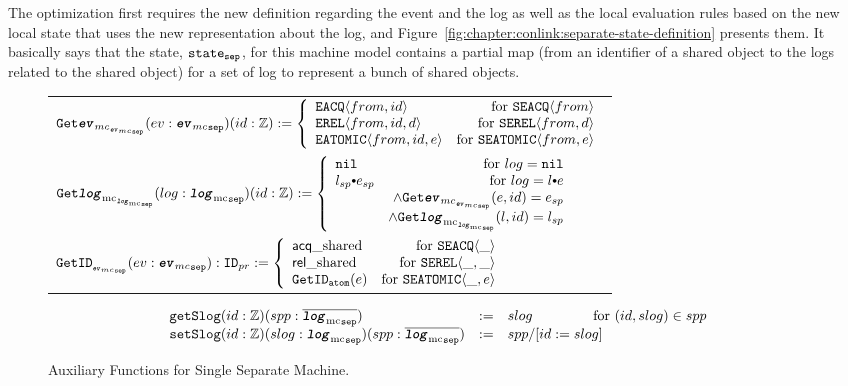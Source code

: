 The optimization first requires the new definition regarding the event and the log as well as 
the local evaluation rules based on the new local state that uses the new representation about the log,
and Figure~\ref{fig:chapter:conlink:separate-state-definition} presents them. 
It basically says that the state, ${{\mathrm{\texttt{state}}}_{{\mathrm{\texttt{sep}}}}}$, for this machine model contains a partial map (from an identifier of a shared object to the logs related to the shared object) for a set of log to represent a bunch of shared objects.


\begin{figure}
\noindent{}
\begin{center}
\begin{tabular}{l}
$
   {{{\mathrm{\texttt{Get}}}{{\mathrm{\texttt{\textbf{\textit{ev}}}}}_{mc}}}_{_{{{{\mathrm{\texttt{\textbf{\textit{ev}}}}}_{mc}}_{{\mathrm{\texttt{sep}}}}}}}}(ev : {{{\mathrm{\texttt{\textbf{\textit{ev}}}}}_{mc}}_{{\mathrm{\texttt{sep}}}}}) (id : {\mathbb{Z}}) 
      :=  \left\{\begin{array}{lr}
        {{{\mathrm{\texttt{EACQ}}}}\langle{from}, {id}\rangle} & \text{for } {{{\mathrm{\texttt{SEACQ}}}}\langle{from}\rangle}\\
        {{{\mathrm{\texttt{EREL}}}}\langle{from}, {id}, {d}\rangle} & \text{for } {{{\mathrm{\texttt{SEREL}}}}\langle{from}, {d}\rangle}\\
        {{{\mathrm{\texttt{EATOMIC}}}}\langle{from}, {id}, {e}\rangle} & \text{for } {{{\mathrm{\texttt{SEATOMIC}}}}\langle{from},{e}\rangle} \\
        \end{array} \right.
$\\
$
   \separatelogtwologkwd(log : \separatelogtypekwd) (id : \ztype) 
      :=  \left\{\begin{array}{lr}
        \nulllist & \text{for } log = \nulllist \\
        \listconsoppo{e_{sp}}{l_{sp}} & \text{for }  log = \listconsoppo{e}{l} \\
        & \wedge \separateeventtwoevent{e}{id}{e_{sp}}\\
        & \wedge \separatelogtwolog{l}{id}{l_{sp}}\\
        \end{array} \right.
$\\
$
{{\mathrm{\texttt{Get}}}{\mathrm{\texttt{ID}}}_{_{{{{\mathrm{\texttt{\textbf{\textit{ev}}}}}_{mc}}_{{\mathrm{\texttt{sep}}}}}}}} (ev : {{{\mathrm{\texttt{\textbf{\textit{ev}}}}}_{mc}}_{{\mathrm{\texttt{sep}}}}}) : {{\mathrm{\texttt{ID}}}_{pr}} :=
 \left\{\begin{array}{lr}
         {\mbox{\textsf{acq}}\_\mbox{shared}}& \text{for } {{{\mathrm{\texttt{SEACQ}}}}\langle{\_}\rangle}\\
        {\mbox{\textsf{rel}}\_\mbox{shared}} & \text{for } {{{\mathrm{\texttt{SEREL}}}}\langle{\_}, {\_}\rangle}\\
        {{\mathrm{\texttt{GetID}}}_{{\mathrm{\texttt{atom}}}}({e})} & \text{for } {{{\mathrm{\texttt{SEATOMIC}}}}\langle{\_},{e}\rangle} \\
 \end{array} \right.
$\\
\end{tabular}
\end{center}
$$
\begin{array}{lll}
  \getseplogkwd (id :\ztype)(spp : \separatelogkwd)  &:= & slog\ \ \ \ \ \ \ \  \ \ \ \ \  \hfill{\text{for } (id, slog) \in spp}\\
   \setseplogkwd (id :\ztype) (slog : \separatelogtypekwd) (spp: \separatelogkwd) &:= &spp/[id := slog]\\
\end{array}
$$
\caption{Auxiliary Functions for Single Separate Machine.}
\label{fig:chapter:conlink:auxiliary-funcitons-for-single-separate-machine}
\end{figure}

